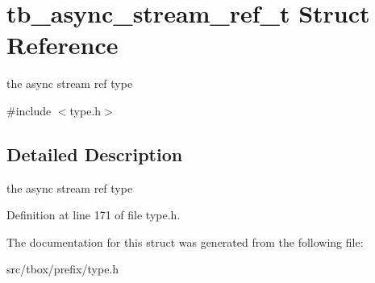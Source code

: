 \hypertarget{structtb__async__stream__ref__t}{\section{tb\-\_\-async\-\_\-stream\-\_\-ref\-\_\-t Struct Reference}
\label{structtb__async__stream__ref__t}
}


the async stream ref type  




{\ttfamily \#include $<$type.\-h$>$}



\subsection{Detailed Description}
the async stream ref type 

Definition at line 171 of file type.\-h.



The documentation for this struct was generated from the following file\-:\begin{DoxyCompactItemize}
\item 
src/tbox/prefix/type.\-h\end{DoxyCompactItemize}
